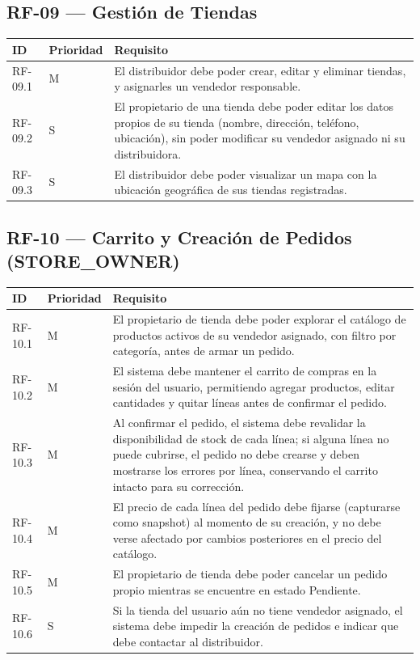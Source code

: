 \documentclass[12pt,a4paper]{report}
\begin{document}
\subsection{RF-09 --- Gestión de Tiendas}

\begin{longtable}{|p{2cm}|p{2cm}|p{10cm}|}
\hline
\textbf{ID} & \textbf{Prioridad} & \textbf{Requisito} \\ \hline
RF-09.1 & M & El distribuidor debe poder crear, editar y eliminar tiendas, y asignarles un vendedor responsable. \\ \hline
RF-09.2 & S & El propietario de una tienda debe poder editar los datos propios de su tienda (nombre, dirección, teléfono, ubicación), sin poder modificar su vendedor asignado ni su distribuidora. \\ \hline
RF-09.3 & S & El distribuidor debe poder visualizar un mapa con la ubicación geográfica de sus tiendas registradas. \\ \hline
\end{longtable}

\subsection{RF-10 --- Carrito y Creación de Pedidos (STORE\_OWNER)}

\begin{longtable}{|p{2cm}|p{2cm}|p{10cm}|}
\hline
\textbf{ID} & \textbf{Prioridad} & \textbf{Requisito} \\ \hline
RF-10.1 & M & El propietario de tienda debe poder explorar el catálogo de productos activos de su vendedor asignado, con filtro por categoría, antes de armar un pedido. \\ \hline
RF-10.2 & M & El sistema debe mantener el carrito de compras en la sesión del usuario, permitiendo agregar productos, editar cantidades y quitar líneas antes de confirmar el pedido. \\ \hline
RF-10.3 & M & Al confirmar el pedido, el sistema debe revalidar la disponibilidad de stock de cada línea; si alguna línea no puede cubrirse, el pedido no debe crearse y deben mostrarse los errores por línea, conservando el carrito intacto para su corrección. \\ \hline
RF-10.4 & M & El precio de cada línea del pedido debe fijarse (capturarse como snapshot) al momento de su creación, y no debe verse afectado por cambios posteriores en el precio del catálogo. \\ \hline
RF-10.5 & M & El propietario de tienda debe poder cancelar un pedido propio mientras se encuentre en estado Pendiente. \\ \hline
RF-10.6 & S & Si la tienda del usuario aún no tiene vendedor asignado, el sistema debe impedir la creación de pedidos e indicar que debe contactar al distribuidor. \\ \hline
\end{longtable}
\end{document}
